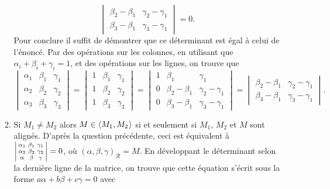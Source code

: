 \documentclass[a4paper,12pt,reqno]{amsart}
\begin{document}
\begin{solution}
\begin{enumerate}
\begin{enumerate}
      $$
        \begin{vmatrix}
          \beta_{2} - \beta_{1} & \gamma_{2} - \gamma_{1}\\
          \beta_{3} - \beta_{1} & \gamma_{3} - \gamma_{1}
        \end{vmatrix} = 0.
      $$
      Pour conclure il suffit de démontrer que ce déterminant est égal à celui de l'énoncé.
      Par des opérations sur les colonnes, en utilisant que $\alpha_{i} + \beta_{i} + \gamma_{i} = 1$, et des opérations sur les lignes, on trouve que
      $$
        \begin{vmatrix}
          \alpha_1 & \beta_1 & \gamma_1 \\
          \alpha_2 & \beta_2 & \gamma_2 \\
          \alpha_3 & \beta_3 & \gamma_3
        \end{vmatrix}
        =
        \begin{vmatrix}
          1 & \beta_1 & \gamma_1 \\
          1 & \beta_2 & \gamma_2 \\
          1 & \beta_3 & \gamma_3
        \end{vmatrix}
        =
        \begin{vmatrix}
          1 & \beta_1               & \gamma_1                \\
          0 & \beta_{2} - \beta_{1} & \gamma_{2} - \gamma_{1} \\
          0 & \beta_{3} - \beta_{1} & \gamma_{3} - \gamma_{1}
        \end{vmatrix}
        =
        \begin{vmatrix}
          \beta_{2} - \beta_{1} & \gamma_{2} - \gamma_{1}\\
          \beta_{3} - \beta_{1} & \gamma_{3} - \gamma_{1}
        \end{vmatrix}.
      $$
      \item Si $M_{1} \neq M_{2}$ alors $M \in \langle{M_{1},M_{2}}\kern.07em\rangle$ si et seulement si $M_1$, $M_2$ et $M$ sont alignés. D'après la question précédente, ceci est équivalent à
      $
       \begin{vsmallmatrix}
          \alpha_1 & \beta_1 & \gamma_1 \\
          \alpha_2 & \beta_2 & \gamma_2 \\
          \alpha   & \beta   & \gamma
        \end{vsmallmatrix}
        =0
      $,
      où $(\alpha,\beta,\gamma)_{\mathcal{R}} = M$. En développant le déterminant selon la dernière ligne de la matrice, on trouve que cette équation s'écrit sous la forme $a\alpha + b\beta + c\gamma  = 0$ avec

\end{enumerate}
\end{enumerate}
\end{solution}
\end{document}
